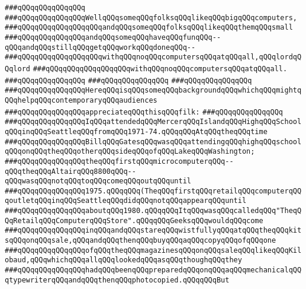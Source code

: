 \verb|###qQQqqQQqqQQqqQQq|\newline
\verb|###qQQqqQQqqQQqqQQqWellqQQqsomeqQQqfolksqQQqlikeqQQqbigqQQqcomputers,|\newline
\verb|###qQQqqQQqqQQqqQQqqQQqandqQQqsomeqQQqfolksqQQqlikeqQQqthemqQQqsmall|\newline
\verb|###qQQqqQQqqQQqqQQqandqQQqsomeqQQqhaveqQQqfunqQQq--qQQqandqQQqstillqQQqgetqQQqworkqQQqdoneqQQq--|\newline
\verb|###qQQqqQQqqQQqqQQqqQQqwithqQQqnoqQQqcomputersqQQqatqQQqall,qQQqlordqQQqlord|\newline
\verb|###qQQqqQQqqQQqqQQqqQQqwithqQQqnoqQQqcomputersqQQqatqQQqall.|\newline
\verb|###qQQqqQQqqQQqqQQq|\newline
\verb|###qQQqqQQqqQQqqQQq|\newline
\verb|###qQQqqQQqqQQqqQQq|\newline
\verb|###qQQqqQQqqQQqqQQqHereqQQqisqQQqsomeqQQqbackgroundqQQqwhichqQQqmightqQQqhelpqQQqcontemporaryqQQqaudiences|\newline
\verb|###qQQqqQQqqQQqqQQqappreciateqQQqthisqQQqfilk:|\newline
\verb|###qQQqqQQqqQQqqQQq|\newline
\verb|###qQQqqQQqqQQqqQQqIqQQqattendedqQQqMercerqQQqIslandqQQqHighqQQqSchoolqQQqinqQQqSeattleqQQqfromqQQq1971-74.qQQqqQQqAtqQQqtheqQQqtime|\newline
\verb|###qQQqqQQqqQQqqQQqBillqQQqGatesqQQqwasqQQqattendingqQQqhighqQQqschoolqQQqonqQQqtheqQQqotherqQQqsideqQQqofqQQqLakeqQQqWashington;|\newline
\verb|###qQQqqQQqqQQqqQQqtheqQQqfirstqQQqmicrocomputerqQQq--qQQqtheqQQqAltairqQQq8800qQQq--qQQqwasqQQqnotqQQqtoqQQqcomeqQQqoutqQQquntil|\newline
\verb|###qQQqqQQqqQQqqQQq1975.qQQqqQQq(TheqQQqfirstqQQqretailqQQqcomputerqQQqoutletqQQqinqQQqSeattleqQQqdidqQQqnotqQQqappearqQQquntil|\newline
\verb|###qQQqqQQqqQQqqQQqaboutqQQq1980.qQQqqQQqItqQQqwasqQQqcalledqQQq"TheqQQqRetailqQQqComputerqQQqStore".qQQqqQQqGeeksqQQqwouldqQQqcome|\newline
\verb|###qQQqqQQqqQQqqQQqinqQQqandqQQqstareqQQqwistfullyqQQqatqQQqtheqQQqkitsqQQqonqQQqsale,qQQqandqQQqthenqQQqbuyqQQqaqQQqcopyqQQqofqQQqone|\newline
\verb|###qQQqqQQqqQQqqQQqofqQQqtheqQQqmagazinesqQQqonqQQqsaleqQQqlikeqQQqKilobaud,qQQqwhichqQQqallqQQqlookedqQQqasqQQqthoughqQQqthey|\newline
\verb|###qQQqqQQqqQQqqQQqhadqQQqbeenqQQqpreparedqQQqonqQQqaqQQqmechanicalqQQqtypewriterqQQqandqQQqthenqQQqphotocopied.qQQqqQQqBut|\newline
